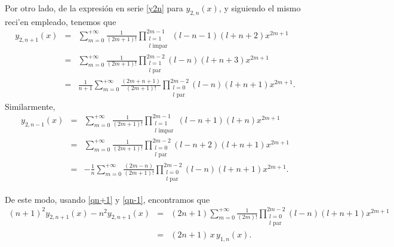 
Por otro lado, de la expresi\'on en serie \eqref{y2n} para $y_{2,n}(x)$, y  siguiendo el mismo reci'en empleado, tenemos que
\begin{eqnarray}
y_{2,n+1}(x)&=&\sum_{m= 0}^{+\infty}\frac{1}{(2m+1)!}
\prod_{\substack{l=1 \\ l \text{ impar}}}^{2m-1}
(l-n-1)(l+n+2)x^{2m+1}\\
&=&\sum_{m= 0}^{+\infty}\frac{1}{(2m+1)!}
\prod_{\substack{l=1 \\ l \text{ par}}}^{2m-2}
(l-n)(l+n+3)x^{2m+1}\\
&=&\frac{1}{n+1}\sum_{m= 0}^{+\infty}\frac{(2m+n+1)}{(2m+1)!}
\prod_{\substack{l=0 \\ l \text{ par}}}^{2m-2}
(l-n)(l+n+1)x^{2m+1}. \label{qn+1}
\end{eqnarray}
Similarmente, 
\begin{eqnarray}
y_{2,n-1}(x)&=&\sum_{m= 0}^{+\infty}\frac{1}{(2m+1)!}
\prod_{\substack{l=1 \\ l \text{ impar}}}^{2m-1}
 (l-n+1)(l+n)x^{2m+1}\\
&=&\sum_{m= 0}^{+\infty}\frac{1}{(2m+1)!}
\prod_{\substack{l=0 \\ l \text{ par}}}^{2m-2}
 (l-n+2)(l+n+1)x^{2m+1}\\
 &=&-\frac{1}{n}\sum_{m= 0}^{+\infty}\frac{(2m-n)}{(2m+1)!}
\prod_{\substack{l=0 \\ l \text{ par}}}^{2m-2}
 (l-n)(l+n+1)x^{2m+1}. \label{qn-1}
\end{eqnarray}

De este modo, usando \eqref{qn+1} y \eqref{qn-1}, encontramos que
\begin{eqnarray}
(n+1)^2y_{2,n+1}(x)-n^2y_{2,n+1}(x)&=&(2n+1)\sum_{m= 0}^{+\infty}\frac{1}{(2m)!}
\prod_{\substack{l=0 \\ l \text{ par}}}^{2m-2}
 (l-n)(l+n+1)x^{2m+1} \\
 &=&(2n+1)\,x\,y_{1,n}(x). \label{dos}
\end{eqnarray}

